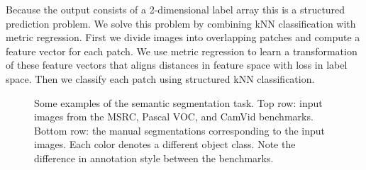 \documentclass[a4paper,titlepage]{article}
\begin{document}
Because the output consists of a 2-dimensional label array this is a structured prediction problem. We solve this problem by combining \ac{kNN} classification with metric regression. First we divide images into overlapping patches and compute a feature vector for each patch. We use metric regression to learn a transformation of these feature vectors that aligns distances in feature space with loss in label space. Then we classify each patch using structured \ac{kNN} classification.

\begin{figure}[tbh]
\begin{center}
\caption{Some examples of the semantic segmentation task. Top row: input images from the MSRC, Pascal VOC, and CamVid benchmarks. Bottom row: the manual segmentations corresponding to the input images. Each color denotes a different object class. Note the difference in annotation style between the benchmarks.}
\label{fig:segmentation_examples}
\end{center}
\end{figure}

\end{document}
